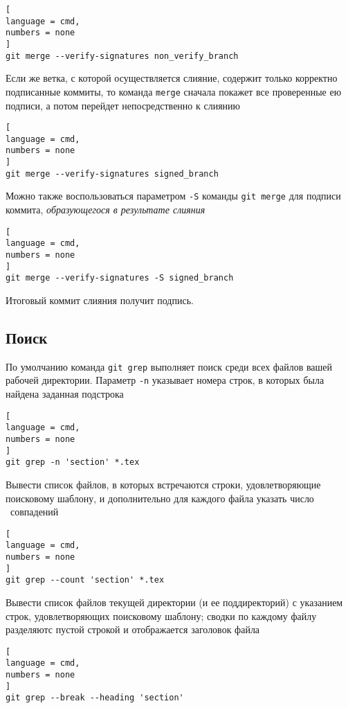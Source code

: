 \documentclass[%
	11pt,
	a4paper,
	utf8,
		]{article}
\begin{document}
\begin{lstlisting}[
language = cmd,
numbers = none
]
git merge --verify-signatures non_verify_branch
\end{lstlisting}

Если же ветка, с которой осуществляется слияние, содержит только корректно подписанные коммиты, то команда \texttt{merge} сначала покажет все проверенные ею подписи, а потом перейдет непосредственно к слиянию

\begin{lstlisting}[
language = cmd,
numbers = none
]
git merge --verify-signatures signed_branch
\end{lstlisting}

Можно также воспользоваться параметром \texttt{-S} команды \texttt{git merge} для подписи коммита, \emph{образующегося в результате слияния}

\begin{lstlisting}[
language = cmd,
numbers = none
]
git merge --verify-signatures -S signed_branch
\end{lstlisting}

Итоговый коммит слияния получит подпись.


\subsection{Поиск}

По умолчанию команда \texttt{git grep} выполняет поиск среди всех файлов вашей рабочей директории. Параметр \texttt{-n} указывает номера строк, в которых была найдена заданная подстрока

\begin{lstlisting}[
language = cmd,
numbers = none
]
git grep -n 'section' *.tex
\end{lstlisting}

Вывести список файлов, в которых встречаются строки, удовлетворяющие поисковому шаблону, и дополнительно для каждого файла указать число  совпадений

\begin{lstlisting}[
language = cmd,
numbers = none
]
git grep --count 'section' *.tex
\end{lstlisting}

Вывести список файлов текущей директории (и ее поддиректорий) с указанием строк, удовлетворяющих поисковому шаблону; сводки по каждому файлу разделяютс пустой строкой и отображается заголовок файла

\begin{lstlisting}[
language = cmd,
numbers = none
]
git grep --break --heading 'section'
\end{lstlisting}
\end{document}
